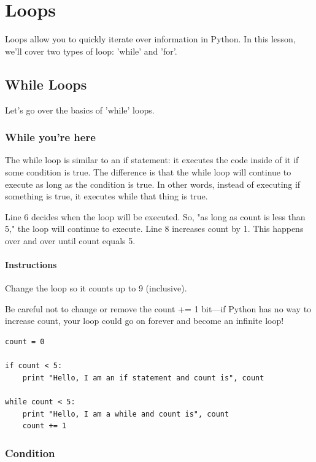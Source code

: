 \documentclass[12pt,a4paper,final,twoside,onecolumn,titlepage]{book}
\begin{document}
\chapter{Loops}
Loops allow you to quickly iterate over information in Python. In this lesson, we'll cover two types of loop: 'while' and 'for'.

\section{While Loops}
Let's go over the basics of 'while' loops.
\subsection{While you're here}

The while loop is similar to an if statement: it executes the code inside of it if some condition is true. The difference is that the while loop will continue to execute as long as the condition is true. In other words, instead of executing if something is true, it executes while that thing is true.

Line 6 decides when the loop will be executed. So, "as long as count is less than 5," the loop will continue to execute. Line 8 increases count by 1. This happens over and over until count equals 5.
\subsubsection{Instructions}

Change the loop so it counts up to 9 (inclusive).

Be careful not to change or remove the count += 1 bit—if Python has no way to increase count, your loop could go on forever and become an infinite loop!
\begin{lstlisting}
count = 0

if count < 5:
    print "Hello, I am an if statement and count is", count
    
while count < 5:
    print "Hello, I am a while and count is", count
    count += 1
\end{lstlisting}

\subsection{Condition}
\end{document}
